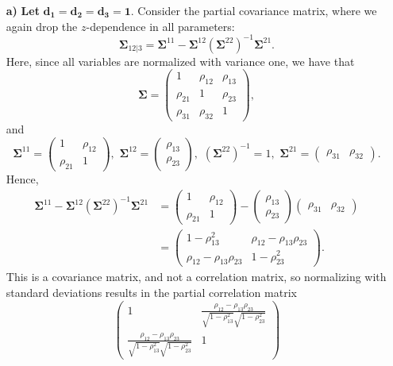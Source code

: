 \documentclass[
  12pt,
  letterpaper]{article}
\numberwithin{equation}{section}
\newcommand{\fSigma}{\bm{\Sigma}}
\begin{document}
\begin{itemize}
\item[\textbf{a)}] \textbf{Let} $\bm{d_1 = d_2 = d_3 = 1}$. Consider the partial covariance matrix, where we again drop the $z$-dependence in all parameters: 
$$\fSigma_{12|3} = \fSigma^{11} - \fSigma^{12}\left(\fSigma^{22}\right)^{-1}\fSigma^{21}.$$
Here, since all variables are normalized with variance one, we have that
$$\fSigma = \begin{pmatrix} 1 & \rho_{12} & \rho_{13} \\ \rho_{21} & 1 & \rho_{23} \\ \rho_{31} & \rho_{32} & 1 \end{pmatrix},$$
and 
$$\fSigma^{11} = \begin{pmatrix} 1 & \rho_{12} \\ \rho_{21} & 1 \end{pmatrix}, \,\, \fSigma^{12} = \begin{pmatrix} \rho_{13} \\ \rho_{23} \end{pmatrix},\,\, \left(\fSigma^{22}\right)^{-1} = 1, \,\, \fSigma^{21} = \begin{pmatrix} \rho_{31} & \rho_{32} \end{pmatrix}.$$
Hence,
\begin{align*}
\fSigma^{11} - \fSigma^{12}\left(\fSigma^{22}\right)^{-1}\fSigma^{21} &=  \begin{pmatrix} 1 & \rho_{12} \\ \rho_{21} & 1 \end{pmatrix} - \begin{pmatrix} \rho_{13} \\ \rho_{23} \end{pmatrix} \begin{pmatrix} \rho_{31} & \rho_{32} \end{pmatrix} \\
&= \begin{pmatrix} 1 - \rho_{13}^2 & \rho_{12} - \rho_{13}\rho_{23} \\ \rho_{12} - \rho_{13}\rho_{23} & 1 - \rho_{23}^2 \end{pmatrix}.
\end{align*}
This is a covariance matrix, and not a correlation matrix, so normalizing with standard deviations results in the partial correlation matrix
\begin{equation}
\begin{pmatrix}
1 & \frac{\rho_{12} - \rho_{13}\rho_{23}}{\sqrt{1-\rho_{13}^2}\sqrt{1-\rho_{23}^2}} \\  \frac{\rho_{12} - \rho_{13}\rho_{23}}{\sqrt{1-\rho_{13}^2}\sqrt{1-\rho_{23}^2}} & 1 

\end{pmatrix}
\end{equation}
\end{itemize}
\end{document}
